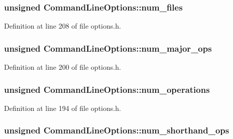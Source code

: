 \subsubsection[{\texorpdfstring{num\+\_\+files}{num_files}}]{\setlength{\rightskip}{0pt plus 5cm}unsigned Command\+Line\+Options\+::num\+\_\+files}\hypertarget{struct_command_line_options_aaefd053012280f5acc3195dec7e5823f}{}\label{struct_command_line_options_aaefd053012280f5acc3195dec7e5823f}


Definition at line 208 of file options.\+h.

\subsubsection[{\texorpdfstring{num\+\_\+major\+\_\+ops}{num_major_ops}}]{\setlength{\rightskip}{0pt plus 5cm}unsigned Command\+Line\+Options\+::num\+\_\+major\+\_\+ops}\hypertarget{struct_command_line_options_a0b451b17ee21eac4af89c6f8b0ee6f6e}{}\label{struct_command_line_options_a0b451b17ee21eac4af89c6f8b0ee6f6e}


Definition at line 200 of file options.\+h.

\subsubsection[{\texorpdfstring{num\+\_\+operations}{num_operations}}]{\setlength{\rightskip}{0pt plus 5cm}unsigned Command\+Line\+Options\+::num\+\_\+operations}\hypertarget{struct_command_line_options_a9260ad89111479f29fd3726343324d58}{}\label{struct_command_line_options_a9260ad89111479f29fd3726343324d58}


Definition at line 194 of file options.\+h.

\subsubsection[{\texorpdfstring{num\+\_\+shorthand\+\_\+ops}{num_shorthand_ops}}]{\setlength{\rightskip}{0pt plus 5cm}unsigned Command\+Line\+Options\+::num\+\_\+shorthand\+\_\+ops}\hypertarget{struct_command_line_options_aa4e0d58629ffe5f1d4947c5622fea2da}{}\label{struct_command_line_options_aa4e0d58629ffe5f1d4947c5622fea2da}


